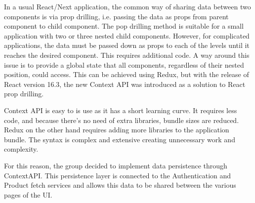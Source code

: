 In a usual React/Next application, the common way of sharing data between two components is via prop drilling, i.e. passing the data as props from parent component to child component. The pop drilling method is suitable for a small application with two or three nested child components. However, for complicated applications, the data must be passed down as props to each of the levels until it reaches the desired component. This requires additional code. A way around this issue is to provide a global state that all components, regardless of their nested position, could access. This can be achieved using Redux, but with the release of React version 16.3, the new Context API was introduced as a solution to React prop drilling. 

Context API is easy to is use as it has a short learning curve. It requires less code, and because there's no need of extra libraries, bundle sizes are reduced. Redux on the other hand requires adding more libraries to the application bundle. The syntax is complex and extensive creating unnecessary work and complexity. 

For this reason, the group decided to implement data persistence through ContextAPI. This persistence layer is connected to the Authentication and Product fetch services and allows this data to be shared between the various pages of the UI. 